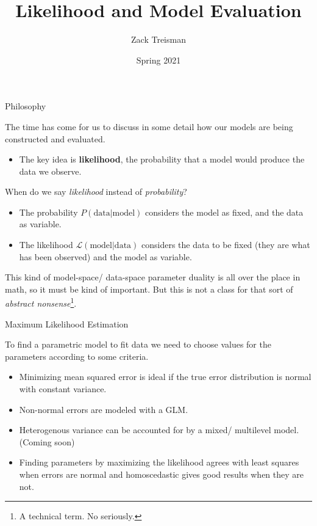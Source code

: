 \documentclass[
  ignorenonframetext,
]{beamer}
\title{Likelihood and Model Evaluation}
\author{Zack Treisman}
\date{Spring 2021}
\providecommand{\tightlist}{%
  \setlength{\itemsep}{0pt}\setlength{\parskip}{0pt}}
\begin{document}
\frame{\titlepage}

\begin{frame}{Philosophy}
\protect\hypertarget{philosophy}{}

The time has come for us to discuss in some detail how our models are
being constructed and evaluated.

\begin{itemize}
\tightlist
\item
  The key idea is \textbf{likelihood}, the probability that a model
  would produce the data we observe.
\end{itemize}

When do we say \emph{likelihood} instead of \emph{probability}?

\begin{itemize}
\tightlist
\item
  The probability \(P(\text{data}|\text{model})\) considers the model as
  fixed, and the data as variable.
\item
  The likelihood \(\mathcal{L}(\text{model}|\text{data})\) considers the
  data to be fixed (they are what has been observed) and the model as
  variable.
\end{itemize}

This kind of model-space/ data-space parameter duality is all over the
place in math, so it must be kind of important. But this is not a class
for that sort of \emph{abstract
nonsense}\footnote{A technical term. No seriously.}.

\end{frame}

\begin{frame}{Maximum Likelihood Estimation}
\protect\hypertarget{maximum-likelihood-estimation}{}

To find a parametric model to fit data we need to choose values for the
parameters according to some criteria.

\begin{itemize}
\tightlist
\item
  Minimizing mean squared error is ideal if the true error distribution
  is normal with constant variance.
\item
  Non-normal errors are modeled with a GLM.
\item
  Heterogenous variance can be accounted for by a mixed/ multilevel
  model. (Coming soon)
\item
  Finding parameters by maximizing the likelihood agrees with least
  squares when errors are normal and homoscedastic gives good results
  when they are not.
\end{itemize}

\end{frame}
\end{document}
